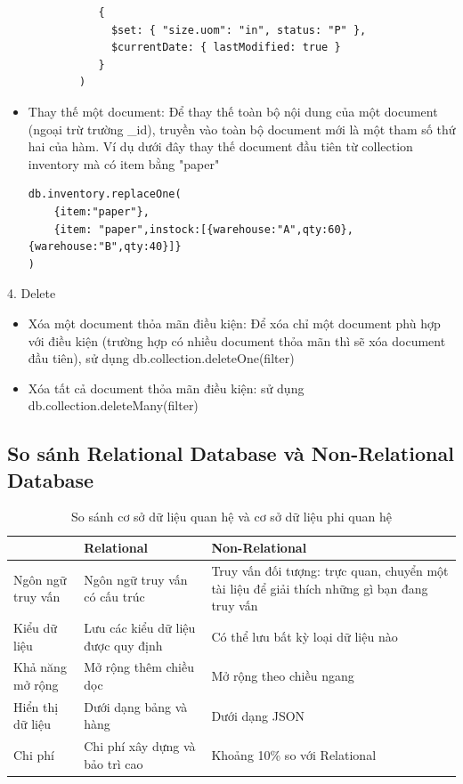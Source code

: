 \begin{description}
\begin{itemize}
\begin{verbatim}
           {
             $set: { "size.uom": "in", status: "P" },
             $currentDate: { lastModified: true }
           }
        )
    \end{verbatim}
    \item Thay thế một document: Để thay thế toàn bộ nội dung của một document (ngoại trừ trường \_id), truyền vào toàn bộ document mới là một tham số thứ hai của hàm. Ví dụ dưới đây thay thế document đầu tiên từ collection inventory mà có item bằng "paper"
\begin{verbatim}
db.inventory.replaceOne(
    {item:"paper"},
    {item: "paper",instock:[{warehouse:"A",qty:60},{warehouse:"B",qty:40}]}
)
\end{verbatim}
\end{itemize}
\item 4. Delete\\
\begin{itemize}
    \item Xóa một document thỏa mãn điều kiện: Để xóa chỉ một document phù hợp với điều kiện (trường hợp có nhiều document thỏa mãn thì sẽ xóa document đầu tiên), sử dụng db.collection.deleteOne(filter)
    \item Xóa tất cả document thỏa mãn điều kiện: sử dụng db.collection.deleteMany(filter)

\end{itemize}
\end{description}
\subsection{So sánh Relational Database và Non-Relational Database}
\begin{table}[H]
	    \centering
	    \begin{tabular}{|p{3cm}|p{6cm}|p{6cm}|}
	        \hline
	        &\textbf{Relational}&\textbf{Non-Relational}\\
	        \hline
	        Ngôn ngữ truy vấn&Ngôn ngữ truy vấn có cấu trúc &Truy vấn đối tượng: trực quan, chuyển một tài liệu để giải thích những gì bạn đang truy vấn\\
	        \hline
	        Kiểu dữ liệu&Lưu các kiểu dữ liệu được quy định&Có thể lưu bất kỳ loại dữ liệu nào\\
	        \hline
	        Khả năng mở rộng&Mở rộng thêm chiều dọc&Mở rộng theo chiều ngang\\
	        \hline
	        Hiển thị dữ liệu&Dưới dạng bảng và hàng&Dưới dạng JSON\\
	        \hline
	        Chi phí&Chi phí xây dựng và bảo trì cao&Khoảng 10\% so với Relational\\
	        \hline
	    \end{tabular}
	    \caption{So sánh cơ sở dữ liệu quan hệ và cơ sở dữ liệu phi quan hệ}
	\end{table}
